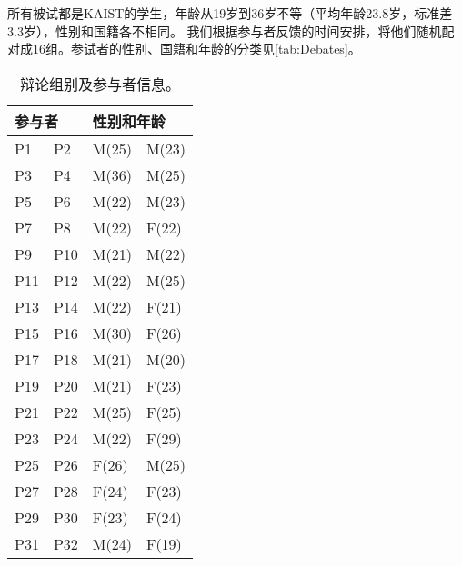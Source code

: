 所有被试都是KAIST的学生，年龄从19岁到36岁不等（平均年龄23.8岁，标准差3.3岁），性别和国籍各不相同。
我们根据参与者反馈的时间安排，将他们随机配对成16组。参试者的性别、国籍和年龄的分类见\autoref{tab:Debates}。
\begin{table}[htbp]
    \centering
    \footnotesize
    \setlength{\abovecaptionskip}{-0.1cm}
    \setlength{\belowcaptionskip}{0.2cm}
    \renewcommand\arraystretch{1.5}
    \caption[辩论组别及参与者信息。]{辩论组别及参与者信息。}
    \label{tab:Debates}
    \begin{tabular}{|lp{2cm}|lp{2cm}|}
    \hline
    \multicolumn{2}{|l|}{参与者}       & \multicolumn{2}{l|}{性别和年龄}         \\ \hline
    \multicolumn{1}{|p{2cm}|}{P1}  & P2  & \multicolumn{1}{p{2cm}|}{M(25)} & M(23) \\ \hline
    \multicolumn{1}{|p{2cm}|}{P3}  & P4  & \multicolumn{1}{p{2cm}|}{M(36)} & M(25) \\ \hline
    \multicolumn{1}{|l|}{P5}  & P6  & \multicolumn{1}{l|}{M(22)} & M(23) \\ \hline
    \multicolumn{1}{|l|}{P7}  & P8  & \multicolumn{1}{l|}{M(22)} & F(22) \\ \hline
    \multicolumn{1}{|l|}{P9}  & P10 & \multicolumn{1}{l|}{M(21)} & M(22) \\ \hline
    \multicolumn{1}{|l|}{P11} & P12 & \multicolumn{1}{l|}{M(22)} & M(25) \\ \hline
    \multicolumn{1}{|l|}{P13} & P14 & \multicolumn{1}{l|}{M(22)} & F(21) \\ \hline
    \multicolumn{1}{|l|}{P15} & P16 & \multicolumn{1}{l|}{M(30)} & F(26) \\ \hline
    \multicolumn{1}{|l|}{P17} & P18 & \multicolumn{1}{l|}{M(21)} & M(20) \\ \hline
    \multicolumn{1}{|l|}{P19} & P20 & \multicolumn{1}{l|}{M(21)} & F(23) \\ \hline
    \multicolumn{1}{|l|}{P21} & P22 & \multicolumn{1}{l|}{M(25)} & F(25) \\ \hline
    \multicolumn{1}{|l|}{P23} & P24 & \multicolumn{1}{l|}{M(22)} & F(29) \\ \hline
    \multicolumn{1}{|l|}{P25} & P26 & \multicolumn{1}{l|}{F(26)} & M(25) \\ \hline
    \multicolumn{1}{|l|}{P27} & P28 & \multicolumn{1}{l|}{F(24)} & F(23) \\ \hline
    \multicolumn{1}{|l|}{P29} & P30 & \multicolumn{1}{l|}{F(23)} & F(24) \\ \hline
    \multicolumn{1}{|l|}{P31} & P32 & \multicolumn{1}{l|}{M(24)} & F(19) \\ \hline
    \end{tabular}
    \end{table}
